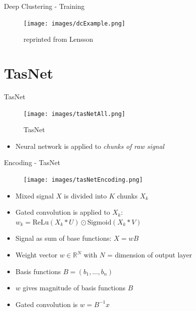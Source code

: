 \documentclass[xcolor=table,mathserif,9pt]{beamer}    %
\begin{document}
\begin{frame}{Deep Clustering - Training}
	
\begin{figure}[htpb]
	\centering
	\texttt{[image: images/dcExample.png]}
	\caption{reprinted from Lensson}
\end{figure}

\end{frame}

\section{TasNet}%
\label{sec:tasnet}
\begin{frame}{TasNet \cite{TasNet2017}}

\begin{figure}[htpb]
	\centering
	\texttt{[image: images/tasNetAll.png]}
	\caption{TasNet}
\end{figure}
\vspace{10mm}
\begin{itemize}
	\item Neural network is applied to \emph{chunks of raw signal}
\end{itemize}

\end{frame}

\begin{frame}{Encoding - TasNet}

\begin{minipage}[t]{0.48\linewidth}
	\begin{figure}[htpb]
		\centering
		\texttt{[image: images/tasNetEncoding.png]}
	\end{figure}
\end{minipage}%
\hfill%
\begin{minipage}[t]{0.48\linewidth}
	\begin{itemize}
		\item Mixed signal $X$ is divided into $K$ chunks $X_k$ 
		\item Gated convolution is applied to $X_k$: 
		\emph{$w_k = \text{ReLu}(X_k * U) \odot \text{Sigmoid}(X_k * V)$}
	\end{itemize}
	\vspace{5mm}
	\begin{itemize}
		\item Signal as sum of base functions: $X = wB$
		\item Weight vector $w \in \mathbb{R}^{N}$ with $N$ = 
		      dimension of output layer
		\item Basis functions $B = (b_1, ...,b_n)$ 
		\item $w$ gives magnitude of basis functions $B$
		\item Gated convolution is \emph{$w = B^{-1}x$}
	\end{itemize}
\end{minipage}	



\end{frame}
\end{document}
